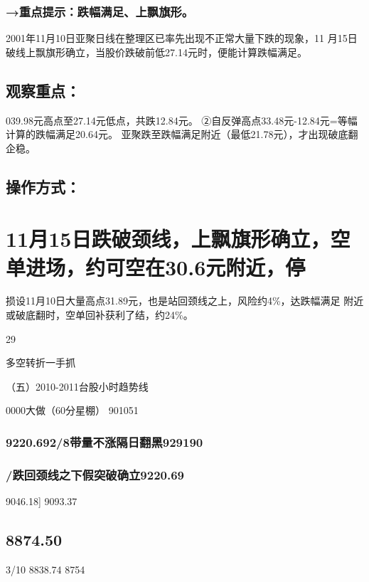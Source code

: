 \documentclass{article}
\begin{document}
\subsubsection{→重点提示：跌幅满足、上飘旗形。}

2001年11月10日亚聚日线在整理区已率先出现不正常大量下跌的现象，11 月15日破线上飘旗形确立，当股价跌破前低27.14元时，便能计算跌幅满足。

\subsection{观察重点：}

039.98元高点至27.14元低点，共跌12.84元。 ②自反弹高点33.48元-12.84元=等幅计算的跌幅满足20.64元。 亚聚跌至跌幅满足附近（最低21.78元），才出现破底翻企稳。

\subsection{操作方式：}

\section{11月15日跌破颈线，上飘旗形确立，空单进场，约可空在30.6元附近，停}

损设11月10日大量高点31.89元，也是站回颈线之上，风险约4\%，达跌幅满足 附近或破底翻时，空单回补获利了结，约24\%。

29

\clearpage

多空转折一手抓

（五）2010-2011台股小时趋势线

0000大做（60分星棚） 901051

\subsubsection{9220.692/8带量不涨隔日翻黑929190}

\subsubsection{/跌回颈线之下假突破确立9220.69}

9046.18] 9093.37

\subsection{8874.50}

3/10 8838.74 8754
\end{document}
